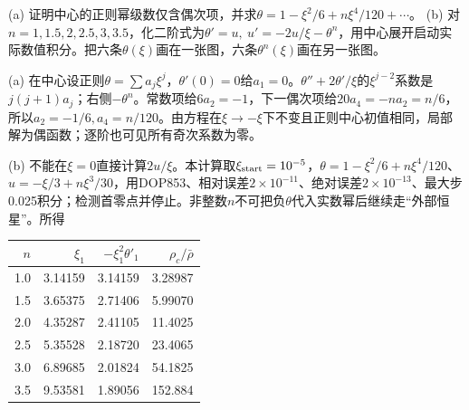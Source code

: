 \begin{exercise}
(a) 证明中心的正则幂级数仅含偶次项，并求$\theta=1-\xi^2/6+n\xi^4/120+\cdots$。
(b) 对$n=1,1.5,2,2.5,3,3.5$，化二阶式为$\theta'=u,\ u'=-2u/\xi-\theta^n$，用中心展开启动实际数值积分。把六条$\theta(\xi)$画在一张图，六条$\theta^n(\xi)$画在另一张图。
\end{exercise}
\begin{solution}
(a) 在中心设正则$\theta=\sum a_j\xi^j$，$\theta'(0)=0$给$a_1=0$。$\theta''+2\theta'/\xi$的$\xi^{j-2}$系数是$j(j+1)a_j$；右侧$-\theta^n$。常数项给$6a_2=-1$，下一偶次项给$20a_4=-na_2=n/6$，所以$a_2=-1/6,a_4=n/120$。由方程在$\xi\to-\xi$下不变且正则中心初值相同，局部解为偶函数；逐阶也可见所有奇次系数为零。

(b) 不能在$\xi=0$直接计算$2u/\xi$。本计算取$\xi_{\rm start}=10^{-5}$，$\theta=1-\xi^2/6+n\xi^4/120$、$u=-\xi/3+n\xi^3/30$，用DOP853、相对误差$2\times10^{-11}$、绝对误差$2\times10^{-13}$、最大步0.025积分；检测首零点并停止。非整数$n$不可把负$\theta$代入实数幂后继续走“外部恒星”。所得
\begin{center}\begin{tabular}{rrrr}\toprule
$n$&$\xi_1$&$-\xi_1^2\theta'_1$&$\rho_c/\bar\rho$\\\midrule
1.0&3.14159&3.14159&3.28987\\
1.5&3.65375&2.71406&5.99070\\
2.0&4.35287&2.41105&11.4025\\
2.5&5.35528&2.18720&23.4065\\
3.0&6.89685&2.01824&54.1825\\
3.5&9.53581&1.89056&152.884\\\bottomrule
\end{tabular}\end{center}
\begin{center}
\end{center}
\end{solution}
